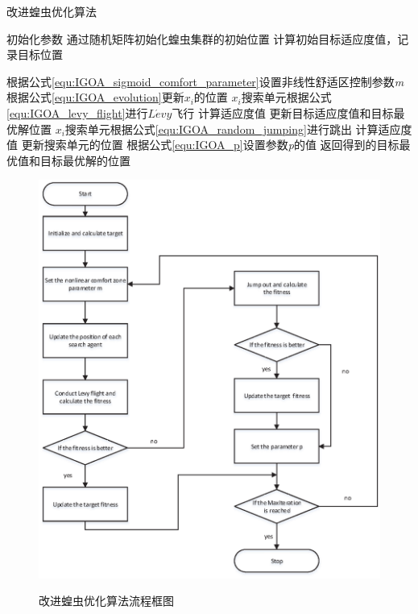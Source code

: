 \begin{algorithm}
    \caption{改进蝗虫优化算法}
    \label{alg:IGOA}
    
    \begin{algorithmic}[1]
    
    \State 初始化参数
    \State 通过随机矩阵初始化蝗虫集群的初始位置
    \State 计算初始目标适应度值，记录目标位置
    
    \State 根据公式\ref{equ:IGOA_sigmoid_comfort_parameter}设置非线性舒适区控制参数\emph{m}
    \State 根据公式\ref{equ:IGOA_evolution}更新$x_i$的位置
    \State $x_i$搜索单元根据公式\ref{equ:IGOA_levy_flight}进行$L\acute{e}vy$飞行
    \State 计算适应度值 
        \State 更新目标适应度值和目标最优解位置
    \Else
        \State $x_i$搜索单元根据公式\ref{equ:IGOA_random_jumping}进行跳出
        \State 计算适应度值
            \State 更新搜索单元的位置
        \EndIf
        \State 根据公式\ref{equ:IGOA_p}设置参数\emph{p}的值
    \EndIf
    \EndWhile
    \State 返回得到的目标最优值和目标最优解的位置
    \end{algorithmic}
\end{algorithm}

\graphicspath{{Img/}}
\begin{figure}[htbp]
    \centering
    \includegraphics[width=1\linewidth]{procedure_of_IGOA.eps}\hfill\\[0.5cm]
  \caption{改进蝗虫优化算法流程框图}
  \label{fig:procedure_IGOA}
\end{figure}
